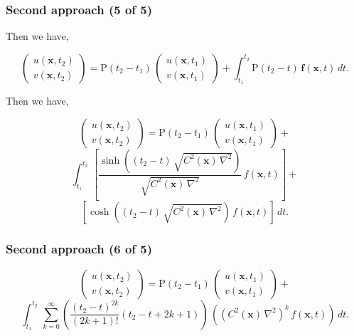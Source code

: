 \documentclass{beamer}
\newcommand{\twovec}[2]{ \left( \begin{array}{c} #1  \\ #2   \end{array} \right) }
\begin{document}
\begin{frame}
\frametitle{Second approach (5 of 5)}
\begin{flushleft}
Then we have,
\end{flushleft}
\begin{equation*}
\twovec{ u(\mathbf{x},t_2) }{ v(\mathbf{x},t_2) }  = \textrm{P}(t_2-t_1) \, \twovec{ u(\mathbf{x},t_1) }{ v(\mathbf{x},t_1) } + \int_{t_1}^{t_2}  \textrm{P}(t_2-t) \, \textbf{f}(\mathbf{x},t) \, dt.
\end{equation*}
\begin{flushleft}
Then we have,
\end{flushleft}
\begin{equation*}
\twovec{ u(\mathbf{x},t_2) }{ v(\mathbf{x},t_2) }  = \textrm{P}(t_2-t_1) \, \twovec{ u(\mathbf{x},t_1) }{ v(\mathbf{x},t_1) } +
\end{equation*}
\begin{equation*}
 \int_{t_1}^{t_2}  \, \left[  \frac{ \sinh((t_2-t) \, \sqrt{C^2(\mathbf{x}) \, \nabla^2}) }{\sqrt{C^2(\mathbf{x}) \, \nabla^2}} \,  f(\mathbf{x},t)  \right]+ 
\end{equation*}
\begin{equation*}
\left[ \cosh((t_2-t) \, \sqrt{C^2(\mathbf{x}) \, \nabla^2}) \,  f(\mathbf{x},t)  \right]\, dt.
\end{equation*}
\end{frame}


\begin{frame}
\frametitle{Second approach (6 of 5)}
\begin{equation*}
\twovec{ u(\mathbf{x},t_2) }{ v(\mathbf{x},t_2) }  = \textrm{P}(t_2-t_1) \, \twovec{ u(\mathbf{x},t_1) }{ v(\mathbf{x},t_1) } +
\end{equation*}
\begin{equation*}
 \int_{t_1}^{t_2} \, \sum_{k=0}^\infty \left( \frac{(t_2-t)^{2k}}{(2k+1)!} (t_2-t+2k+1) \right) \, \left( (C^2(\mathbf{x}) \, \nabla^2 )^k \,  f(\mathbf{x},t) \right) \, dt.
\end{equation*}
\end{frame}
\end{document}
